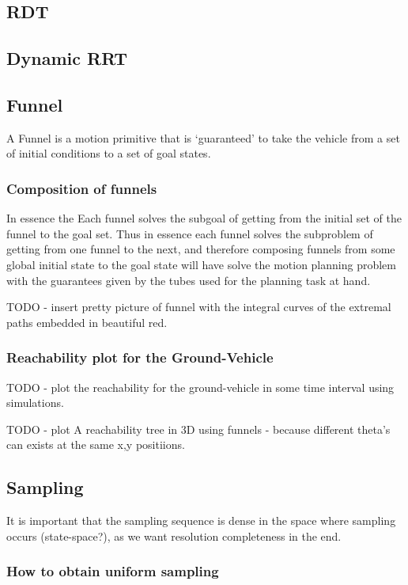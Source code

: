 \subsection{RDT}


\subsection{Dynamic RRT}

\subsection{Funnel}

A Funnel is a motion primitive that is `guaranteed' to take the vehicle from a
set of initial conditions to a set of goal states. 

\subsubsection{Composition of funnels}

In essence the 
Each funnel solves the subgoal of getting from the initial set of the funnel to
the goal set. Thus in essence each funnel solves the subproblem of getting from
one funnel to the next, and therefore composing funnels from some global initial
state to the goal state will have solve the motion planning problem with the
guarantees given by the tubes used for the planning task at hand.

TODO - insert pretty picture of funnel with the integral curves of the extremal
paths embedded in beautiful red.

\subsubsection{Reachability plot for the Ground-Vehicle}
TODO - plot the reachability for the ground-vehicle in some time interval using
simulations. 

TODO - plot A reachability tree in 3D using funnels - because different theta's
can exists at the same x,y positiions.

\subsection{Sampling}
It is important that the sampling sequence is dense in the space where sampling
occurs (state-space?), as we want resolution completeness in the end.
\subsubsection{How to obtain uniform sampling}
